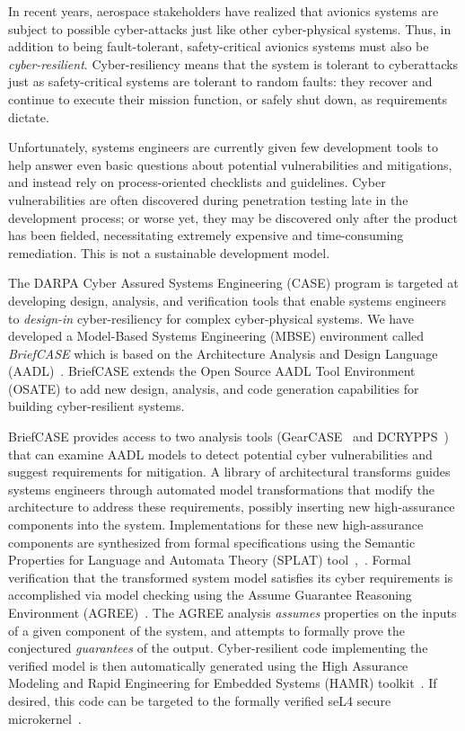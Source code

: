 In recent years, aerospace stakeholders have realized that avionics systems are subject to possible cyber-attacks just like other cyber-physical systems.  Thus, in addition to being fault-tolerant, safety-critical avionics systems must also be {\em cyber-resilient}. Cyber-resiliency means that the system is tolerant to cyberattacks just as safety-critical systems are tolerant to random faults: they recover and continue to execute their mission function, or safely shut down, as requirements dictate. 

Unfortunately, systems engineers are currently given few development tools to help answer even basic questions about potential vulnerabilities and mitigations, and instead rely on process-oriented checklists and guidelines.  Cyber vulnerabilities are often discovered during penetration testing late in the development process; or worse yet, they may be discovered only after the product has been fielded, necessitating extremely expensive and time-consuming remediation. This is not a sustainable development model.

The DARPA Cyber Assured Systems Engineering (CASE) program is targeted at developing design, analysis, and verification tools that enable systems engineers to {\em design-in} cyber-resiliency for complex cyber-physical systems.
We have developed a Model-Based Systems Engineering (MBSE) environment called {\em BriefCASE} which is based on the Architecture Analysis and Design Language (AADL)~\cite{aadl}.  BriefCASE extends the Open Source AADL Tool Environment (OSATE) to add new design, analysis, and code generation capabilities for building cyber-resilient systems.  

BriefCASE provides access to two analysis tools (GearCASE~\cite{gearcase2020} and DCRYPPS~\cite{dcrypps2019}) that can examine AADL models to detect potential cyber vulnerabilities and suggest requirements for mitigation.  
A library of architectural transforms guides systems engineers through automated model transformations that modify the architecture to address these requirements, possibly inserting new high-assurance components into the system. 
Implementations for these new high-assurance components are synthesized from formal specifications using the Semantic Properties for Language and Automata Theory (SPLAT) tool~\cite{slind-hcss2020},~\cite{formal-filter-synth-langsec}.
Formal verification that the transformed system model satisfies its cyber requirements is accomplished via model checking using the Assume Guarantee Reasoning Environment (AGREE)~\cite{agree2013}.  The AGREE analysis \emph{assumes} properties on the inputs of a given component of the system, and attempts to formally prove the conjectured \emph{guarantees} of the output.  Cyber-resilient code implementing the verified model is then automatically generated using the High Assurance Modeling and Rapid Engineering for Embedded Systems (HAMR) toolkit~\cite{hamr}.  If desired, this code can be targeted to the formally verified seL4 secure microkernel~\cite{sel4-2009}.

